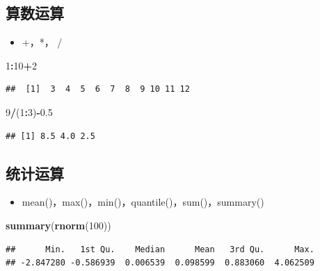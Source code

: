 \documentclass[]{book}
\newenvironment{Shaded}{\begin{snugshade}}{\end{snugshade}}
\newcommand{\DecValTok}[1]{\textcolor[rgb]{0.00,0.00,0.81}{#1}}
\newcommand{\FloatTok}[1]{\textcolor[rgb]{0.00,0.00,0.81}{#1}}
\newcommand{\KeywordTok}[1]{\textcolor[rgb]{0.13,0.29,0.53}{\textbf{#1}}}
\newcommand{\NormalTok}[1]{#1}
\newcommand{\OperatorTok}[1]{\textcolor[rgb]{0.81,0.36,0.00}{\textbf{#1}}}
\providecommand{\tightlist}{%
  \setlength{\itemsep}{0pt}\setlength{\parskip}{0pt}}
\begin{document}
\hypertarget{section-9}{%
\subsection{算数运算}\label{section-9}}

\begin{itemize}
\tightlist
\item
  +，*， /
\end{itemize}

\begin{Shaded}
\begin{Highlighting}[]
\DecValTok{1}\OperatorTok{:}\DecValTok{10}\OperatorTok{+}\DecValTok{2}
\end{Highlighting}
\end{Shaded}

\begin{verbatim}
##  [1]  3  4  5  6  7  8  9 10 11 12
\end{verbatim}

\begin{Shaded}
\begin{Highlighting}[]
\DecValTok{9}\OperatorTok{/}\NormalTok{(}\DecValTok{1}\OperatorTok{:}\DecValTok{3}\NormalTok{)}\OperatorTok{-}\FloatTok{0.5}
\end{Highlighting}
\end{Shaded}

\begin{verbatim}
## [1] 8.5 4.0 2.5
\end{verbatim}

\hypertarget{section-10}{%
\subsection{统计运算}\label{section-10}}

\begin{itemize}
\tightlist
\item
  mean()，max()，min()，quantile()，sum()，summary()
\end{itemize}

\begin{Shaded}
\begin{Highlighting}[]
\KeywordTok{summary}\NormalTok{(}\KeywordTok{rnorm}\NormalTok{(}\DecValTok{100}\NormalTok{))}
\end{Highlighting}
\end{Shaded}

\begin{verbatim}
##      Min.   1st Qu.    Median      Mean   3rd Qu.      Max. 
## -2.847280 -0.586939  0.006539  0.098599  0.883060  4.062509
\end{verbatim}
\end{document}
